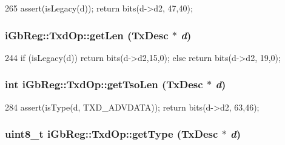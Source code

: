 \begin{DoxyCode}
265 { assert(isLegacy(d)); return bits(d->d2, 47,40); }
\end{DoxyCode}
\hypertarget{namespaceiGbReg_1_1TxdOp_ad1ccf1bd606d966d7549916b3562aebd}{
\subsubsection[{getLen}]{ iGbReg::TxdOp::getLen (TxDesc $\ast$ {\em d})}}
\label{namespaceiGbReg_1_1TxdOp_ad1ccf1bd606d966d7549916b3562aebd}



\begin{DoxyCode}
244 { if (isLegacy(d)) return bits(d->d2,15,0); else return bits(d->d2, 19,0); }
\end{DoxyCode}
\hypertarget{namespaceiGbReg_1_1TxdOp_a48e87927f1617006b0965381efcf5dfd}{
\subsubsection[{getTsoLen}]{\setlength{\rightskip}{0pt plus 5cm}int iGbReg::TxdOp::getTsoLen (TxDesc $\ast$ {\em d})}}
\label{namespaceiGbReg_1_1TxdOp_a48e87927f1617006b0965381efcf5dfd}



\begin{DoxyCode}
284 { assert(isType(d, TXD_ADVDATA)); return bits(d->d2, 63,46); }
\end{DoxyCode}
\hypertarget{namespaceiGbReg_1_1TxdOp_ad65ec34f7f59b2b32ca47bd649ebcb2a}{
\subsubsection[{getType}]{\setlength{\rightskip}{0pt plus 5cm}uint8\_\-t iGbReg::TxdOp::getType (TxDesc $\ast$ {\em d})}}
\label{namespaceiGbReg_1_1TxdOp_ad65ec34f7f59b2b32ca47bd649ebcb2a}



